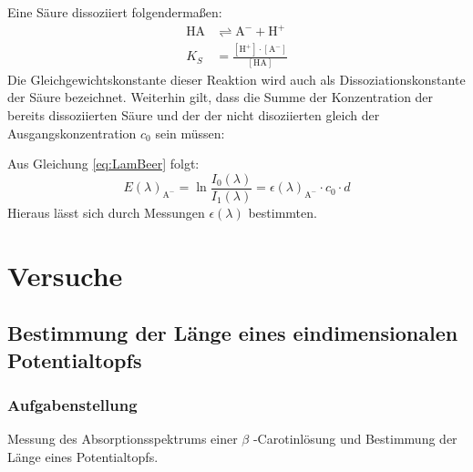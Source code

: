 \documentclass{scrartcl}
\begin{document}
Eine Säure  dissoziiert folgendermaßen:
\begin{subequations}
	\begin{align}
		\text{HA} &\rightleftharpoons \text{A}^- + \text{H}^+ \\
		K_S &= \frac{[\text{H}^+] \cdot [\text{A}^-]}{[\text{HA}]} \label{eq:Ks}
	\end{align}
\end{subequations}
Die Gleichgewichtskonstante dieser Reaktion wird auch als Dissoziationskonstante der Säure bezeichnet. Weiterhin gilt, dass die Summe der Konzentration der bereits dissoziierten Säure und der der nicht disoziierten gleich der Ausgangskonzentration $c_0$ sein müssen: 

Aus Gleichung \ref{eq:LamBeer} folgt: 
\begin{equation}\label{eq:Extk}
	E(\lambda)_{\text{A}^-}=\ln{\frac{I_0(\lambda)}{I_1(\lambda)}} = \epsilon(\lambda)_{\text{A}^-}\cdot c_0\cdot d
\end{equation}
Hieraus lässt sich durch Messungen $\epsilon(\lambda)$ bestimmten.

\section{Versuche}
\subsection{Bestimmung der Länge eines eindimensionalen Potentialtopfs}
\subsubsection{Aufgabenstellung}
Messung des Absorptionsspektrums einer $\beta$ -Carotinlösung und Bestimmung der Länge eines Potentialtopfs.
\end{document}
